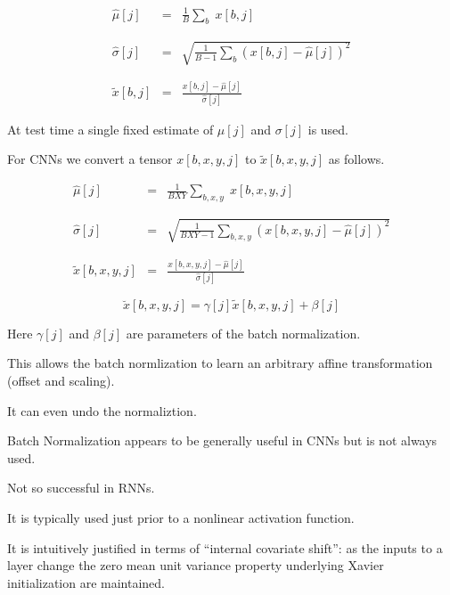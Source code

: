 {\begin{eqnarray*}
  \hat{\mu}[j] & = & \frac{1}{B} \sum_b\;x[b,j] \\
  \\
  \\
  \hat{\sigma}[j] & = & \sqrt{\frac{1}{B-1} \sum_b (x[b,j]-\hat{\mu}[j])^2} \\
  \\
  \\
  \tilde{x}[b,j]& = & \frac{x[b,j] - \hat{\mu}[j]}{\hat{\sigma}[j]}
\end{eqnarray*}


\vfill
At test time a single fixed estimate of $\mu[j]$ and $\sigma[j]$ is used.


For CNNs we convert a tensor $x[b,x,y,j]$ to $\tilde{x}[b,x,y,j]$ as follows.

\begin{eqnarray*}
  \hat{\mu}[j] & = & \frac{1}{BXY} \sum_{b,x,y}\;x[b,x,y,j] \\
  \\
  \\
  \hat{\sigma}[j] & = & \sqrt{\frac{1}{BXY-1} \sum_{b,x,y} (x[b,x,y,j]-\hat{\mu}[j])^2} \\
  \\
  \\
  \tilde{x}[b,x,y,j]& = & \frac{x[b,x,y,j] - \hat{\mu}[j]}{\hat{\sigma}[j]}
\end{eqnarray*}


$$\breve{x}[b,x,y,j] = \gamma[j] \tilde{x}[b,x,y,j] + \beta[j]$$

\vfill
Here $\gamma[j]$ and $\beta[j]$ are parameters of the batch normalization.

\vfill
This allows the batch normlization to learn an arbitrary affine transformation (offset and scaling).

\vfill
It can even undo the normaliztion.


Batch Normalization appears to be generally useful in CNNs but is not always used.

\vfill
Not so successful in RNNs.

\vfill
It is typically used just prior to a nonlinear activation function.

\vfill
It is intuitively justified in terms of ``internal covariate shift'':
as the inputs to a layer change the zero mean unit variance property underlying Xavier initialization are maintained.

}

